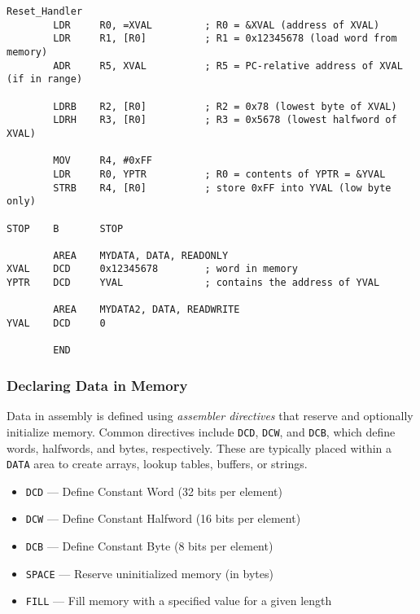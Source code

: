 \begin{lstlisting}[caption={Examples of Load and Store Instructions}]
Reset_Handler
        LDR     R0, =XVAL         ; R0 = &XVAL (address of XVAL)
        LDR     R1, [R0]          ; R1 = 0x12345678 (load word from memory)
        ADR     R5, XVAL          ; R5 = PC-relative address of XVAL (if in range)

        LDRB    R2, [R0]          ; R2 = 0x78 (lowest byte of XVAL)
        LDRH    R3, [R0]          ; R3 = 0x5678 (lowest halfword of XVAL)

        MOV     R4, #0xFF
        LDR     R0, YPTR          ; R0 = contents of YPTR = &YVAL
        STRB    R4, [R0]          ; store 0xFF into YVAL (low byte only)

STOP    B       STOP

        AREA    MYDATA, DATA, READONLY
XVAL    DCD     0x12345678        ; word in memory
YPTR    DCD     YVAL              ; contains the address of YVAL

        AREA    MYDATA2, DATA, READWRITE
YVAL    DCD     0

        END
\end{lstlisting}



\subsubsection{Declaring Data in Memory}

Data in assembly is defined using \emph{assembler directives} that reserve and optionally initialize memory.  
Common directives include \texttt{DCD}, \texttt{DCW}, and \texttt{DCB}, which define words, halfwords, and bytes, respectively.  
These are typically placed within a \texttt{DATA} area to create arrays, lookup tables, buffers, or strings.

\begin{itemize}[nosep]
    \item \texttt{DCD} — Define Constant Word (32 bits per element)
    \item \texttt{DCW} — Define Constant Halfword (16 bits per element)
    \item \texttt{DCB} — Define Constant Byte (8 bits per element)
    \item \texttt{SPACE} — Reserve uninitialized memory (in bytes)
    \item \texttt{FILL} — Fill memory with a specified value for a given length
\end{itemize}

